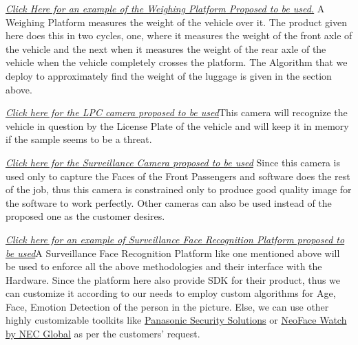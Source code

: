\documentclass[a4paper,11pt]{article}
\begin{document}
\begin{thebibliography}{9}
\textit{\href{http://www.essaedig.com/weigh-in-motion.php}{Click Here for an example of the Weighing Platform Proposed to be used.}}\newline
A Weighing Platform measures the weight of the vehicle over it. The product given here does this in two cycles, one, where it measures the weight of the front axle of the vehicle and the next when it measures the weight of the rear axle of the vehicle when the vehicle completely crosses the platform. The Algorithm that we deploy to approximately find the weight of the luggage is given in the section above.

\textit{\href{https://www.cctvcamerapros.com/License-Plate-Capture-Camera-p/vivotek-ip9165-lpc-kit.htm}{Click here for the LPC camera proposed to be used}}\newline This camera will recognize the vehicle in question by the License Plate of the vehicle and will keep it in memory if the sample seems to be a threat.

\textit{\href{https://ivcco.com/product/mz-hd32-10/}{Click here for the Surveillance Camera proposed to be used}}\newline
Since this camera is used only to capture the Faces of the Front Passengers and software does the rest of the job, thus this camera is constrained only to produce good quality image for the software to work perfectly. Other cameras can also be used instead of the proposed one as the customer desires.

\textit{\href{https://www.facefirst.com/solutions/surveillance-face-recognition/}{Click here for an example of Surveillance Face Recognition Platform proposed to be used}}\newline A Surveillance Face Recognition Platform like one mentioned above will be used to enforce all the above methodologies and their interface with the Hardware. Since the platform here also provide SDK for their product, thus we can customize it according to our needs to employ custom algorithms for Age, Face, Emotion Detection of the person in the picture. Else, we can use other highly customizable toolkits like \href{https://security.panasonic.com/solutions_application/application_solutions/facial_recognition/}{Panasonic Security Solutions} or \href{https://www.nec.com/en/global/solutions/safety/face_recognition/NeoFaceWatch.html}{NeoFace Watch by  NEC Global} as per the customers' request.


\end{thebibliography}
\end{document}
